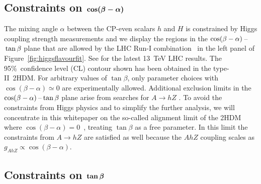 \documentclass[a4paper, 11pt,notoc]{article}
\def\bm#1{\mbox{\boldmath$#1$\unboldmath}}
\begin{document}
\subsection{Constraints on $\bm{\cos (\beta - \alpha)}$}

The mixing angle $\alpha$ between the CP-even scalars $h$ and $H$ is constrained by Higgs coupling strength measurements and we display the regions in the $\cos(\beta-\alpha)\hspace{0.5mm}$--$\hspace{0.5mm}\tan\beta$ plane that are allowed by the LHC Run-I combination~\cite{Khachatryan:2016vau} in  the left panel of Figure~\ref{fig:higgsflavourfit}. See \cite{ATLAS-CONF-2018-031,CMS-PAS-HIG-17-031} for the latest 13~TeV LHC results.  The  95\%~confidence level (CL) contour shown has been obtained in the type-II~2HDM. For arbitrary values of $\tan \beta$, only parameter choices with $\cos(\beta-\alpha) \simeq 0$ are experimentally allowed.  Additional exclusion limits in the $\cos(\beta-\alpha)\hspace{0.5mm}$--$\hspace{0.5mm}\tan\beta$ plane arise from searches for $A \to hZ$ \cite{Aaboud:2017cxo,CMS-PAS-HIG-18-005}. To avoid the constraints from Higgs physics and to simplify the further analysis, we will concentrate in this whitepaper on the so-called alignment limit of the 2HDM where $\cos (\beta - \alpha) = 0$~\cite{Gunion:2002zf}, treating $\tan \beta$ as a free parameter. In this limit the constraints from $A \to hZ$ are satisfied as well because the $AhZ$ coupling scales as $g_{AhZ} \propto \cos (\beta - \alpha)$. 

\subsection{Constraints on $\bm{\tan \beta}$}
\end{document}
